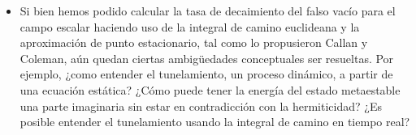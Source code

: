 \documentclass[11pt, a4paper]{article}
\numberwithin{equation}{section}
\theoremstyle{definition}
\begin{document}
\begin{itemize}

\item  Si bien hemos podido calcular la tasa de decaimiento del falso vacío para el campo escalar haciendo uso de la integral de camino euclideana y la aproximación de punto estacionario, tal como lo propusieron Callan y Coleman, aún quedan ciertas ambigüedades conceptuales  ser resueltas. Por ejemplo, ¿como entender el tunelamiento, un proceso dinámico, a partir de una ecuación estática? ¿Cómo puede tener la energía del estado metaestable una parte imaginaria sin estar en contradicción con la hermiticidad? ¿Es posible entender el tunelamiento usando la integral de camino en tiempo real? \cite{Ai:2019dqr}

\printbibliography
{}

\end{itemize}
\end{document}
